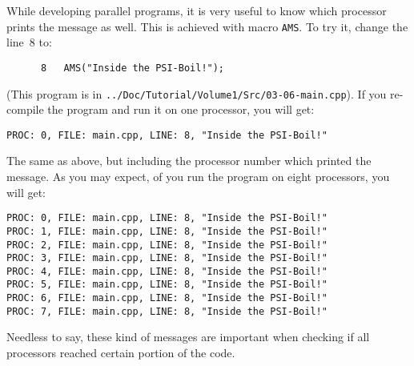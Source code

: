 While developing parallel programs, it is very useful to know which processor
prints the message as well. This is achieved with macro {\tt AMS}. To try it,
change the line~8 to:
%
{\small \begin{verbatim}
      8   AMS("Inside the PSI-Boil!");
\end{verbatim}}
%
(This program is in {\tt ../Doc/Tutorial/Volume1/Src/03-06-main.cpp}). If you
re-compile the program and run it on one processor, you will get:
%
{\small \begin{verbatim}
PROC: 0, FILE: main.cpp, LINE: 8, "Inside the PSI-Boil!"
\end{verbatim}}
%
The same as above, but including the processor number which printed the 
message. As you may expect, of you run the program on eight processors,
you will get:
%
{\small \begin{verbatim}
PROC: 0, FILE: main.cpp, LINE: 8, "Inside the PSI-Boil!"
PROC: 1, FILE: main.cpp, LINE: 8, "Inside the PSI-Boil!"
PROC: 2, FILE: main.cpp, LINE: 8, "Inside the PSI-Boil!"
PROC: 3, FILE: main.cpp, LINE: 8, "Inside the PSI-Boil!"
PROC: 4, FILE: main.cpp, LINE: 8, "Inside the PSI-Boil!"
PROC: 5, FILE: main.cpp, LINE: 8, "Inside the PSI-Boil!"
PROC: 6, FILE: main.cpp, LINE: 8, "Inside the PSI-Boil!"
PROC: 7, FILE: main.cpp, LINE: 8, "Inside the PSI-Boil!"
\end{verbatim}}
%
Needless to say, these kind of messages are important when checking
if all processors reached certain portion of the code. 

